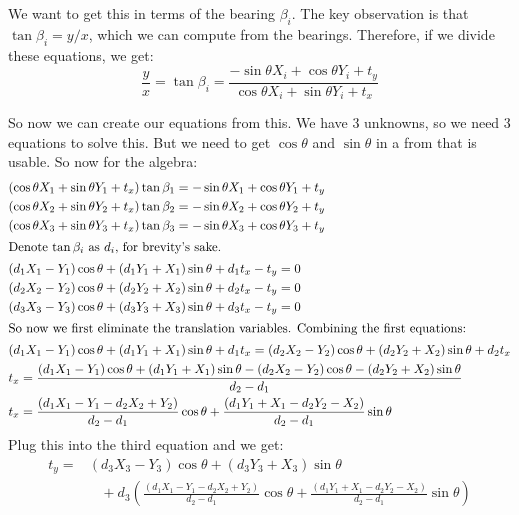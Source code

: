 \documentclass[11pt,english]{article}
\begin{document}
\begin{enumerate}
We want to get this in terms of the bearing $\beta_i$. The key observation is that $\tan \beta_i = y/x$, which we
can compute from the bearings. Therefore, if we divide these equations, we get:
\begin{equation*}
\frac{y}{x} = \tan \beta_i = \frac{-\sin\theta X_i + \cos\theta Y_i + t_y}{\cos\theta X_i + \sin\theta Y_i + t_x}
\end{equation*}

So now we can create our equations from this. We have 3 unknowns, so we need 3 equations to solve this. But we need
to get $\cos \theta$ and $\sin \theta$ in a from that is usable. So now for the algebra:
\begin{align*}
& (\cos\theta X_1 + \sin\theta Y_1 + t_x)\tan \beta_1 = -\sin\theta X_1 + \cos\theta Y_1 + t_y \\
& (\cos\theta X_2 + \sin\theta Y_2 + t_x)\tan \beta_2 = -\sin\theta X_2 + \cos\theta Y_2 + t_y \\
& (\cos\theta X_3 + \sin\theta Y_3 + t_x)\tan \beta_3 = -\sin\theta X_3 + \cos\theta Y_3 + t_y \\
\intertext{Denote $\tan \beta_i$ as $d_i$, for brevity's sake.}
& (d_1 X_1 - Y_1)\cos\theta + (d_1 Y_1 + X_1)\sin\theta + d_1 t_x  - t_y = 0 \\
& (d_2 X_2 - Y_2)\cos\theta + (d_2 Y_2 + X_2)\sin\theta + d_2 t_x  - t_y = 0 \\
& (d_3 X_3 - Y_3)\cos\theta + (d_3 Y_3 + X_3)\sin\theta + d_3 t_x  - t_y = 0 \\
\intertext{So now we first eliminate the translation variables. Combining the first equations:}
& (d_1 X_1 - Y_1)\cos\theta + (d_1 Y_1 + X_1)\sin\theta + d_1 t_x  = 
	(d_2 X_2 - Y_2)\cos\theta + (d_2 Y_2 + X_2)\sin\theta + d_2 t_x  \\
& t_x = \frac{(d_1 X_1 - Y_1)\cos\theta + (d_1 Y_1 + X_1)\sin\theta - 
	(d_2 X_2 - Y_2)\cos\theta - (d_2 Y_2 + X_2)\sin\theta}{d_2 - d_1} \\
& t_x = \frac{(d_1 X_1 - Y_1 - d_2 X_2 + Y_2)}{d_2 - d_1}\cos\theta
		+ \frac{(d_1 Y_1 + X_1 - d_2 Y_2 - X_2)}{d_2 - d_1}\sin\theta \\
\end{align*}
Plug this into the third equation and we get:
\begin{align*}
t_y =& (d_3 X_3 - Y_3)\cos\theta + (d_3 Y_3 + X_3)\sin\theta \\
& \;\;\; + d_3
	\left(\frac{(d_1 X_1 - Y_1 - d_2 X_2 + Y_2)}{d_2 - d_1}\cos\theta
		+ \frac{(d_1 Y_1 + X_1 - d_2 Y_2 - X_2)}{d_2 - d_1}\sin\theta \right) \\

\end{align*}
\end{enumerate}
\end{document}
